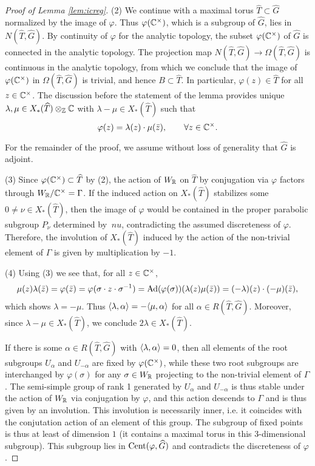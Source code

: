 \documentclass{article}
\theoremstyle{definition}
\numberwithin{equation}{section}
\renewcommand{\-}{\hyp{}}
\begin{document}
\begin{proof}[Proof of Lemma \ref{lem:icreg}]
(2) We continue with a maximal torus $\hat T \subset \hat G$ normalized by the image of $\varphi$. Thus $\varphi(\mathbb{C}^\times)$, which is a subgroup of $\hat G$, lies in $N(\hat T,\hat G)$. By continuity of $\varphi$ for the analytic topology, the subset $\varphi(\mathbb{C}^\times)$ of $\hat G$ is connected in the analytic topology. The projection map $N(\hat T,\hat G) \to \Omega(\hat T,\hat G)$ is continuous in the analytic topology, from which we conclude that the image of $\varphi(\mathbb{C}^\times)$ in $\Omega(\hat T,\hat G)$ is trivial, and hence $B \subset \hat T$. In particular, $\varphi(z) \in \hat T$ for all $z \in \mathbb{C}^\times$. The discussion before the statement of the lemma provides unique $\lambda,\mu \in X_*(\widehat T)\otimes_{\mathbb{Z}}\mathbb{C}$ with $\lambda-\mu \in X_*(\hat T)$ such that
\[ \varphi(z) = \lambda(z) \cdot \mu(\bar z),\qquad \forall z \in \mathbb{C}^\times. \]

For the remainder of the proof, we assume without loss of generality that $\hat G$ is adjoint.

(3) Since $\varphi(\mathbb{C}^\times) \subset \widehat T$ by (2), the action of $W_{\mathbb{R}}$ on $\hat T$ by conjugation via $\varphi$ factors through $W_{\mathbb{R}}/\mathbb{C}^\times=\Gamma$. If the induced action on $X_*(\hat T)$ stabilizes some $0 \neq \nu \in X_*(\hat T)$, then the image of $\varphi$ would be contained in the proper parabolic subgroup $P_\nu$ determined by $\ nu$, contradicting the assumed discreteness of $\varphi$. Therefore, the involution of $X_*(\hat T)$ induced by the action of the non-trivial element of $\Gamma$ is given by multiplication by $-1$. 

(4) Using (3) we see that, for all $z \in \mathbb{C}^\times$,
\[ \mu(z)\lambda(\bar z)=\varphi(\bar z)=\varphi(\sigma \cdot z \cdot \sigma^{-1})=\textrm{Ad}(\varphi(\sigma))(\lambda(z)\mu(\bar z))=(-\lambda)(z) \cdot (-\mu)(\bar z), \] which shows $\lambda=-\mu$. Thus $\langle\lambda,\alpha\rangle=-\langle\mu,\alpha\rangle$ for all $\alpha \in R(\hat T,\hat G)$. Moreover, since $\lambda-\mu \in X_*(\hat T)$, we conclude $2\lambda \in X_*(\hat T)$.

If there is some $\alpha \in R(\hat T,\hat G)$ with $\langle\lambda,\alpha\rangle=0$, then all elements of the root subgroups $U_\alpha$ and $U_{-\alpha}$ are fixed by $\varphi(\mathbb{C}^\times)$, while these two root subgroups are interchanged by $\varphi(\sigma)$ for any $\sigma \in W_{\mathbb{R}}$ projecting to the non-trivial element of $\Gamma$. The semi-simple group of rank 1 generated by $U_\alpha$ and $U_{-\alpha}$ is thus stable under the action of $W_{\mathbb{R}}$ via conjugation by $\varphi$, and this action descends to $\Gamma$ and is thus given by an involution. This involution is necessarily inner, i.e. it coincides with the conjutation action of an element of this group. The subgroup of fixed points is thus at least of dimension $1$ (it contains a maximal torus in this 3-dimensional subgroup). This subgroup lies in $\textrm{Cent}(\varphi,\widehat G)$ and contradicts the discreteness of $\varphi$.


\end{proof}
\end{document}
